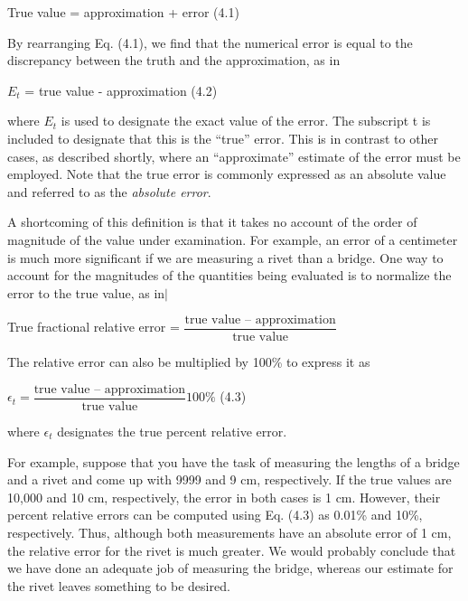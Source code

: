 \documentclass[../main.tex]{subfiles}
\begin{document}
True value = approximation + error
\hfill
(4.1)
\newline

\noindent
By rearranging Eq. (4.1), we find that the numerical error is equal to the discrepancy
between the truth and the approximation, as in
\newline

$E_t$ = true value - approximation
\hfill
(4.2)
\newline

\noindent
where $E_t$ is used to designate the exact value of the error. The subscript t is included to designate
that this is the ``true'' error. This is in contrast to other cases, as described shortly,
where an ``approximate'' estimate of the error must be employed. Note that the true error is
commonly expressed as an absolute value and referred to as the \emph{absolute error}.

A shortcoming of this definition is that it takes no account of the order of magnitude of
the value under examination. For example, an error of a centimeter is much more significant if we are measuring a rivet than a bridge. One way to account for the magnitudes of the
quantities being evaluated is to normalize the error to the true value, as in$\mid$
\newline

True fractional relative error = $\dfrac{\text{true value -- approximation}}{\text{true value}}$
\newline

\noindent
The relative error can also be multiplied by 100\% to express it as
\newline

$\epsilon_t = \dfrac{\text{true value -- approximation}}{\text{true value}} 100\%$
\hfill
(4.3)
\newline

\noindent
where $\epsilon_t$ designates the true percent relative error.

For example, suppose that you have the task of measuring the lengths of a bridge and
a rivet and come up with 9999 and 9 cm, respectively. If the true values are 10,000 and
10 cm, respectively, the error in both cases is 1 cm. However, their percent relative errors
can be computed using Eq. (4.3) as 0.01\% and 10\%, respectively. Thus, although both measurements
have an absolute error of 1 cm, the relative error for the rivet is much greater. We
would probably conclude that we have done an adequate job of measuring the bridge,
whereas our estimate for the rivet leaves something to be desired.
\end{document}
